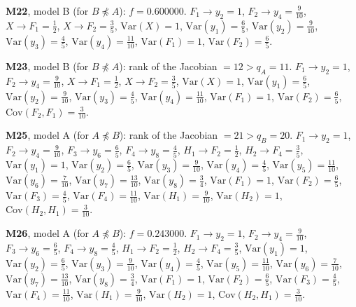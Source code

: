\documentclass[10pt,a4paper]{article}
\newcommand{\nnest}{\not\preceq}
\begin{document}
{\noindent\textbf{M22}, model B (for $B\nnest A$): $f=0.600000$. {\footnotesize $F_{1}\to y_{2}=1$, $F_{2}\to y_{4}=\tfrac{9}{10}$, $X\to F_{1}=\tfrac{1}{2}$, $X\to F_{2}=\tfrac{3}{5}$, $\mathrm{Var}(X)=1$, $\mathrm{Var}(y_{1})=\tfrac{6}{5}$, $\mathrm{Var}(y_{2})=\tfrac{9}{10}$, $\mathrm{Var}(y_{3})=\tfrac{4}{5}$, $\mathrm{Var}(y_{4})=\tfrac{11}{10}$, $\mathrm{Var}(F_{1})=1$, $\mathrm{Var}(F_{2})=\tfrac{6}{5}$.}\par\smallskip
\noindent\textbf{M23}, model B (for $B\nnest A$): rank of the Jacobian $=12>q_A=11$. {\footnotesize $F_{1}\to y_{2}=1$, $F_{2}\to y_{4}=\tfrac{9}{10}$, $X\to F_{1}=\tfrac{1}{2}$, $X\to F_{2}=\tfrac{3}{5}$, $\mathrm{Var}(X)=1$, $\mathrm{Var}(y_{1})=\tfrac{6}{5}$, $\mathrm{Var}(y_{2})=\tfrac{9}{10}$, $\mathrm{Var}(y_{3})=\tfrac{4}{5}$, $\mathrm{Var}(y_{4})=\tfrac{11}{10}$, $\mathrm{Var}(F_{1})=1$, $\mathrm{Var}(F_{2})=\tfrac{6}{5}$, $\mathrm{Cov}(F_{2},F_{1})=\tfrac{3}{10}$.}\par\smallskip
\noindent\textbf{M25}, model A (for $A\nnest B$): rank of the Jacobian $=21>q_B=20$. {\footnotesize $F_{1}\to y_{2}=1$, $F_{2}\to y_{4}=\tfrac{9}{10}$, $F_{3}\to y_{6}=\tfrac{6}{5}$, $F_{4}\to y_{8}=\tfrac{4}{5}$, $H_{1}\to F_{2}=\tfrac{1}{2}$, $H_{2}\to F_{4}=\tfrac{3}{5}$, $\mathrm{Var}(y_{1})=1$, $\mathrm{Var}(y_{2})=\tfrac{6}{5}$, $\mathrm{Var}(y_{3})=\tfrac{9}{10}$, $\mathrm{Var}(y_{4})=\tfrac{4}{5}$, $\mathrm{Var}(y_{5})=\tfrac{11}{10}$, $\mathrm{Var}(y_{6})=\tfrac{7}{10}$, $\mathrm{Var}(y_{7})=\tfrac{13}{10}$, $\mathrm{Var}(y_{8})=\tfrac{3}{4}$, $\mathrm{Var}(F_{1})=1$, $\mathrm{Var}(F_{2})=\tfrac{6}{5}$, $\mathrm{Var}(F_{3})=\tfrac{4}{5}$, $\mathrm{Var}(F_{4})=\tfrac{11}{10}$, $\mathrm{Var}(H_{1})=\tfrac{9}{10}$, $\mathrm{Var}(H_{2})=1$, $\mathrm{Cov}(H_{2},H_{1})=\tfrac{3}{10}$.}\par\smallskip
\noindent\textbf{M26}, model A (for $A\nnest B$): $f=0.243000$. {\footnotesize $F_{1}\to y_{2}=1$, $F_{2}\to y_{4}=\tfrac{9}{10}$, $F_{3}\to y_{6}=\tfrac{6}{5}$, $F_{4}\to y_{8}=\tfrac{4}{5}$, $H_{1}\to F_{2}=\tfrac{1}{2}$, $H_{2}\to F_{4}=\tfrac{3}{5}$, $\mathrm{Var}(y_{1})=1$, $\mathrm{Var}(y_{2})=\tfrac{6}{5}$, $\mathrm{Var}(y_{3})=\tfrac{9}{10}$, $\mathrm{Var}(y_{4})=\tfrac{4}{5}$, $\mathrm{Var}(y_{5})=\tfrac{11}{10}$, $\mathrm{Var}(y_{6})=\tfrac{7}{10}$, $\mathrm{Var}(y_{7})=\tfrac{13}{10}$, $\mathrm{Var}(y_{8})=\tfrac{3}{4}$, $\mathrm{Var}(F_{1})=1$, $\mathrm{Var}(F_{2})=\tfrac{6}{5}$, $\mathrm{Var}(F_{3})=\tfrac{4}{5}$, $\mathrm{Var}(F_{4})=\tfrac{11}{10}$, $\mathrm{Var}(H_{1})=\tfrac{9}{10}$, $\mathrm{Var}(H_{2})=1$, $\mathrm{Cov}(H_{2},H_{1})=\tfrac{3}{10}$.}\par\smallskip
}
\end{document}
